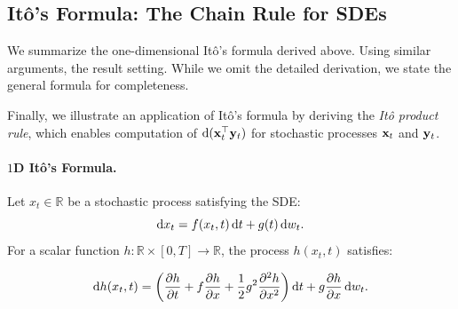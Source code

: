 
\subsection{It\^o's Formula: The Chain Rule for SDEs}
\label{subsec:ito-summary}
We summarize the one-dimensional It\^o's formula derived above. Using similar arguments, the result  setting. While we omit the detailed derivation, we state the general formula for completeness.

Finally, we illustrate an application of It\^o's formula by deriving the \emph{It\^o product rule}, which enables computation of $\mathop{}\!\mathrm{d}({\mathbf{x}}_t^\top {\mathbf{y}}_t)$ for stochastic processes ${\mathbf{x}}_t$ and ${\mathbf{y}}_t$.

\paragraph{$1$D It\^o's Formula.}
Let $x_t \in \mathbb{R}$ be a stochastic process satisfying the SDE:
\[
\mathop{}\!\mathrm{d} x_t = f(x_t, t) \mathop{}\!\mathrm{d} t + g(t) \mathop{}\!\mathrm{d} w_t.
\]
For a scalar function $h \colon \mathbb{R} \times [0, T] \to \mathbb{R}$, the process $h(x_t, t)$ satisfies:
\begin{mdframed}
\[
\mathop{}\!\mathrm{d} h(x_t, t)
= \left( \frac{\partial h}{\partial t} + f \frac{\partial h}{\partial x}
+ \frac{1}{2} g^2 \frac{\partial^2 h}{\partial x^2} \right) \mathop{}\!\mathrm{d} t
+ g \frac{\partial h}{\partial x} \mathop{}\!\mathrm{d} w_t.
\]
\end{mdframed}


